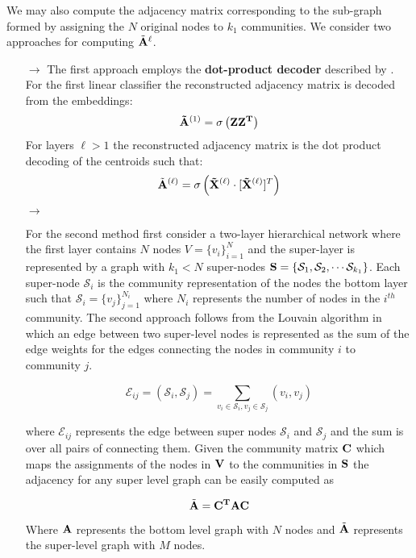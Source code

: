 \documentclass[a4paper,12pt]{article}
\begin{document}
\begin{itemize}
\begin{enumerate}
{\begin{enumerate}
{					We may also compute the adjacency matrix corresponding to the sub-graph formed by assigning the $N$ original nodes to $k_1$ communities. We consider two approaches for computing ${\tilde{\bf A}^{\ell}}$. 
					\begin{itemize}
						\item[$\rightarrow$]{The first approach employs the \textbf{dot-product decoder} described by \cite{kipf2016variational,zhou2023community}. For the first linear classifier the reconstructed adjacency matrix is decoded from the embeddings:
							\[ {\bf \tilde A}^{(1)} = \sigma \left( {\bf Z}\bf{Z}^T \right) \]
						For layers $\ell > 1$ the reconstructed adjacency matrix is the dot product decoding of the centroids such that:
						\[\tilde{\bf A}^{(\ell)} = \sigma\left({\bf \tilde X}^{(\ell)}\cdot [{\bf \tilde X}^{(\ell)}]^T\right) \]
						}
						\item[]
						\item[]
						\item[$\rightarrow$]{
						For the second method first consider a two-layer hierarchical network where the first layer contains $N$ nodes $V = \{v_i\}_{i=1}^N$ and the super-layer is represented by a graph with $k_1<N$ super-nodes $\mathcal{\bf S} = \{\mathcal{S}_1, \mathcal{S}_2, \cdots \mathcal{S}_{k_1}\}$. Each super-node $\mathcal{S}_i$ is the community representation of the nodes the bottom layer such that $\mathcal{S}_i = \{v_j\}_{j=1}^{N_i}$ where $N_i$ represents the number of nodes in the $i^{th}$ community. The second approach follows from the Louvain algorithm \cite{blondel2008fast} in which an edge between two super-level nodes is represented as the sum of the edge weights for the edges connecting the nodes in community $i$ to community $j$. 
						
						\[\mathcal{E}_{ij} = (\mathcal{S}_i, \mathcal{S}_j) = \sum_{v_i \in \mathcal{S}_i, v_j \in \mathcal{S}_j}  (v_i, v_j) \]
						
						where $\mathcal{E}_{ij}$ represents the edge between super nodes $\mathcal{S}_i$ and $\mathcal{S}_j$ and the sum is over all pairs of connecting them. Given the community matrix $\bf C$ which maps the assignments of the nodes in $\bf V$ to the communities in $\mathcal{\bf S}$ the adjacency for any super level graph can be easily computed as 
						
						\[ \tilde{\bf A} = {\bf C^T}{\bf A}{\bf C} \] 
						
						Where $\bf A$ represents the bottom level graph with $N$ nodes and $\tilde{\bf A}$ represents the super-level graph with $M$ nodes.
						}
					\end{itemize}
					}
					

\end{enumerate}}
\end{enumerate}
\end{itemize}
\end{document}
